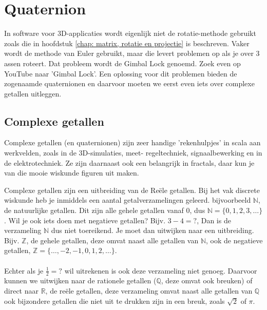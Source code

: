 \chapter{Quaternion}
\label{chap: Quaternion}
In software voor 3D-applicaties wordt eigenlijk niet de rotatie-methode gebruikt zoals die in hoofdstuk \ref{chap: matrix, rotatie en projectie} is beschreven. Vaker wordt de methode van Euler gebruikt, maar die levert problemen op als je over 3 assen roteert. Dat probleem wordt de Gimbal Lock genoemd. Zoek even op YouTube naar 'Gimbal Lock'. 
Een oplossing voor dit problemen bieden de zogenaamde quaternionen en daarvoor moeten we eerst even iets over complexe getallen uitleggen.

\section{Complexe getallen}
Complexe getallen (en quaternionen) zijn zeer handige 'rekenhulpjes' in scala aan werkvelden, zoals in de 3D-simulaties, meet- regeltechniek, signaalbewerking en in de elektrotechniek. Ze zijn daarnaast ook een belangrijk in fractals, daar kun je van die mooie wiskunde figuren uit maken. 

\newpage
Complexe getallen zijn een uitbreiding van de Reële getallen. Bij het vak discrete wiskunde heb je inmiddels een aantal getalverzamelingen geleerd. bijvoorbeeld $\mathbb{N}$, de natuurlijke getallen. Dit zijn alle gehele getallen vanaf $0$, dus $\mathbb{N} = \{0, 1, 2, 3, \dots\}$. Wil je ook iets doen met negatieve getallen? Bijv. $3-4=?$, Dan is de verzameling $\mathbb{N}$ dus niet toereikend. Je moet dan uitwijken naar een uitbreiding. Bijv. $\mathbb{Z}$, de gehele getallen, deze omvat naast alle getallen van $\mathbb{N}$, ook de negatieve getallen, $\mathbb{Z} = \{\dots, -2, -1, 0, 1, 2, \dots \}$. \\ \\
Echter als je $\frac{1}{2} = ?$ wil uitrekenen is ook deze verzameling niet genoeg. Daarvoor kunnen we uitwijken naar de rationele getallen ($\mathbb{Q}$, deze omvat ook breuken) of direct naar $\mathbb{R}$, de reële getallen, deze verzameling omvat naast alle getallen van $\mathbb{Q}$ ook bijzondere getallen die niet uit te drukken zijn in een breuk, zoals $\sqrt{2}$ of $\pi$. \\

